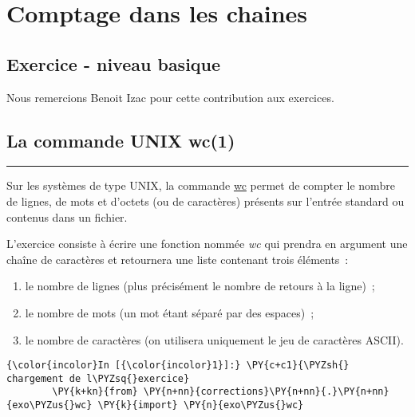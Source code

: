     
    
    
    

    

    \hypertarget{comptage-dans-les-chaines}{%
\section{Comptage dans les chaines}\label{comptage-dans-les-chaines}}

    \hypertarget{exercice---niveau-basique}{%
\subsection{Exercice - niveau basique}\label{exercice---niveau-basique}}

    Nous remercions Benoit Izac pour cette contribution aux exercices.

    \hypertarget{la-commande-unix-wc1}{%
\subsection{La commande UNIX wc(1)}\label{la-commande-unix-wc1}}

\begin{center}\rule{0.5\linewidth}{\linethickness}\end{center}

Sur les systèmes de type UNIX, la commande
\href{http://pubs.opengroup.org/onlinepubs/9699919799/utilities/wc.html}{wc}
permet de compter le nombre de lignes, de mots et d'octets (ou de
caractères) présents sur l'entrée standard ou contenus dans un fichier.

L'exercice consiste à écrire une fonction nommée \emph{wc} qui prendra
en argument une chaîne de caractères et retournera une liste contenant
trois éléments~:

\begin{enumerate}
\def\labelenumi{\arabic{enumi}.}
\tightlist
\item
  le nombre de lignes (plus précisément le nombre de retours à la
  ligne)~;
\item
  le nombre de mots (un mot étant séparé par des espaces)~;
\item
  le nombre de caractères (on utilisera uniquement le jeu de caractères
  ASCII).
\end{enumerate}

    \begin{Verbatim}[commandchars=\\\{\},frame=single,framerule=0.3mm,rulecolor=\color{cellframecolor}]
{\color{incolor}In [{\color{incolor}1}]:} \PY{c+c1}{\PYZsh{} chargement de l\PYZsq{}exercice}
        \PY{k+kn}{from} \PY{n+nn}{corrections}\PY{n+nn}{.}\PY{n+nn}{exo\PYZus{}wc} \PY{k}{import} \PY{n}{exo\PYZus{}wc}
\end{Verbatim}


